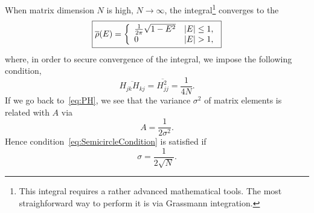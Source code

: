 \documentclass[a4paper,11pt,twoside]{article}
\begin{document}
        When matrix dimension $N$ is high, $N\rightarrow\infty$, the integral\footnote{
            This integral requires a rather advanced mathematical tools.
            The most straighforward way to perform it is via Grassmann integration.
        }
        converges to the ~\cite{Wig57}
        \begin{equation}
            \label{eq:Semicircle}
            \boxed{
                \overline{\rho}(E)=\left\{\begin{array}{ll}
                    \frac{1}{2\pi}\sqrt{1-E^{2}} & \abs{E}\leq 1,\\
                    0 & \abs{E}>1,
                \end{array}
                \right.
            }
        \end{equation}
        where, in order to secure convergence of the integral, we impose the following condition,
        \begin{equation}
            \label{eq:SemicircleCondition}
            \overline{H_{jk}H_{kj}}=\overline{H_{jj}^{2}}=\frac{1}{4N}.
        \end{equation}
        If we go back to~\eqref{eq:PH}, we see that the variance $\sigma^{2}$ of matrix elements is related with $A$ via
        \begin{equation}
            A=\frac{1}{2\sigma^{2}}.
        \end{equation}
        Hence condition~\eqref{eq:SemicircleCondition} is satisfied if
        \begin{equation}
            \sigma=\frac{1}{2\sqrt{N}}.
        \end{equation}
        
\end{document}
